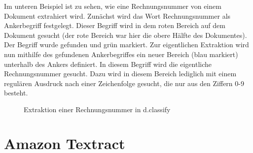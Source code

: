 \documentclass{whswinvcbook}
\begin{document}
Im unteren Beispiel ist zu sehen, wie eine Rechnungsnummer von einem Dokument extrahiert wird. Zunächst wird das Wort Rechnungsnummer als Ankerbegriff festgelegt. Dieser Begriff wird in dem roten Bereich auf dem Dokument gesucht (der rote Bereich war hier die obere Hälfte des Dokumentes). Der Begriff wurde gefunden und grün markiert. Zur eigentlichen Extraktion wird nun mithilfe des gefundenen Ankerbegriffes ein neuer Bereich (blau markiert) unterhalb des Ankers definiert. In diesem Begriff wird die eigentliche Rechnungsnummer gesucht. Dazu wird in diesem Bereich lediglich mit einem regulären Ausdruck nach einer Zeichenfolge gesucht, die nur aus den Ziffern 0-9 besteht.
\begin{figure}[H]
    \centering
    \hfill
    \hfill
    \caption{Extraktion einer Rechnungsnummer in d.classify}
    \label{fig-dclassify}
\end{figure}
\chapter{Amazon Textract}
\end{document}
